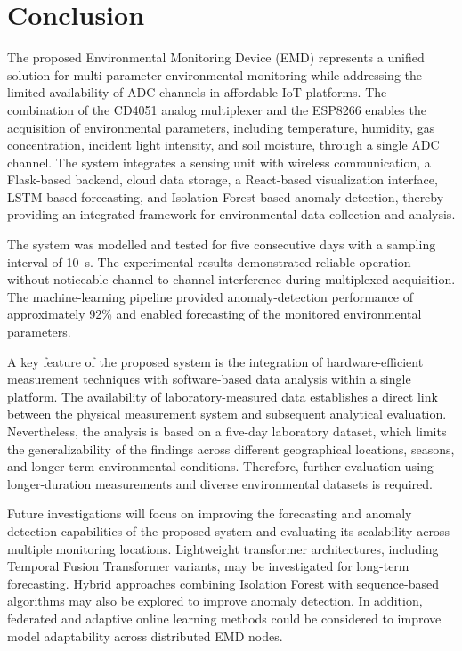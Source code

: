 ﻿\documentclass[journal]{IEEEtran}
\begin{document}




\section{Conclusion}

The proposed Environmental Monitoring Device (EMD) represents a unified
solution for multi-parameter environmental monitoring while addressing the
limited availability of ADC channels in affordable IoT platforms. The
combination of the CD4051 analog multiplexer and the ESP8266 enables the
acquisition of environmental parameters, including temperature, humidity,
gas concentration, incident light intensity, and soil moisture, through a
single ADC channel. The system integrates a sensing unit with wireless
communication, a Flask-based backend, cloud data storage, a React-based
visualization interface, LSTM-based forecasting, and Isolation Forest-based
anomaly detection, thereby providing an integrated framework for environmental
data collection and analysis.

The system was modelled and tested for five consecutive days with a sampling
interval of 10~s. The experimental results demonstrated reliable operation
without noticeable channel-to-channel interference during multiplexed
acquisition. The machine-learning pipeline provided anomaly-detection
performance of approximately 92\% and enabled forecasting of the monitored
environmental parameters.

A key feature of the proposed system is the integration of hardware-efficient
measurement techniques with software-based data analysis within a single
platform. The availability of laboratory-measured data establishes a direct
link between the physical measurement system and subsequent analytical
evaluation. Nevertheless, the analysis is based on a five-day laboratory
dataset, which limits the generalizability of the findings across different
geographical locations, seasons, and longer-term environmental conditions.
Therefore, further evaluation using longer-duration measurements and diverse
environmental datasets is required.

Future investigations will focus on improving the forecasting and anomaly
detection capabilities of the proposed system and evaluating its scalability
across multiple monitoring locations. Lightweight transformer architectures,
including Temporal Fusion Transformer variants, may be investigated for
long-term forecasting. Hybrid approaches combining Isolation Forest with
sequence-based algorithms may also be explored to improve anomaly detection.
In addition, federated and adaptive online learning methods could be considered
to improve model adaptability across distributed EMD nodes.





\end{document}

